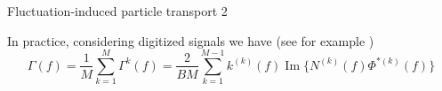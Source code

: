 \documentclass[t,10pt]{beamer}
\renewcommand\Im{\operatorname{Im}}
\begin{document}
\begin{frame}{Fluctuation-induced particle transport 2}
\begin{itemize}
{\footnotesize
\item In practice, considering digitized signals we have
  \footnotesize{(see for example \parencite{Antoni:2000bn})}
\begin{equation*}
\Gamma(f)=\frac{1}{M}\sum_{k=1}^{M}\Gamma^{k}(f) = \frac{2}{BM}\sum_{k=1}^{M-1}k^{(k)}(f)\Im\{N^{(k)}(f)\Phi^{*(k)}(f)\}
\end{equation*}
}


\end{itemize}
\end{frame}
\end{document}
